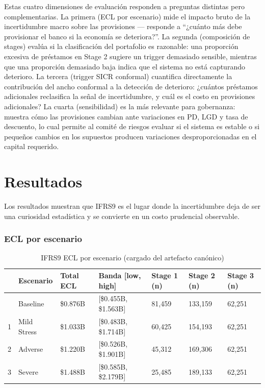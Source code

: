 \documentclass[
  spanish,
  11pt,
  letterpaper,
]{scrbook}
\theoremstyle{plain}
\theoremstyle{remark}
\begin{document}
Estas cuatro dimensiones de evaluación responden a preguntas distintas
pero complementarias. La primera (ECL por escenario) mide el impacto
bruto de la incertidumbre macro sobre las provisiones --- responde a
``¿cuánto más debe provisionar el banco si la economía se deteriora?''.
La segunda (composición de stages) evalúa si la clasificación del
portafolio es razonable: una proporción excesiva de préstamos en Stage 2
sugiere un trigger demasiado sensible, mientras que una proporción
demasiado baja indica que el sistema no está capturando deterioro. La
tercera (trigger SICR conformal) cuantifica directamente la contribución
del ancho conformal a la detección de deterioro: ¿cuántos préstamos
adicionales reclasifica la señal de incertidumbre, y cuál es el costo en
provisiones adicionales? La cuarta (sensibilidad) es la más relevante
para gobernanza: muestra cómo las provisiones cambian ante variaciones
en PD, LGD y tasa de descuento, lo cual permite al comité de riesgos
evaluar si el sistema es estable o si pequeños cambios en los supuestos
producen variaciones desproporcionadas en el capital requerido.

\chapter{Resultados}\label{sec-p2-results}

Los resultados muestran que IFRS9 es el lugar donde la incertidumbre
deja de ser una curiosidad estadística y se convierte en un costo
prudencial observable.

\subsection{ECL por escenario}\label{ecl-por-escenario}

{

\begin{longtable}[]{@{}lllllll@{}}

\caption{\label{tbl-p2-results}IFRS9 ECL por escenario (cargado del
artefacto canónico)}

\tabularnewline

\toprule\noalign{}
& Escenario & Total ECL & Banda {[}low, high{]} & Stage 1 (n) & Stage 2
(n) & Stage 3 (n) \\
\midrule\noalign{}
\endhead
\bottomrule\noalign{}
\endlastfoot
0 & Baseline & \$0.876B & {[}\$0.455B, \$1.563B{]} & 81,459 & 133,159 &
62,251 \\
1 & Mild Stress & \$1.033B & {[}\$0.483B, \$1.714B{]} & 60,425 & 154,193
& 62,251 \\
2 & Adverse & \$1.220B & {[}\$0.526B, \$1.901B{]} & 45,312 & 169,306 &
62,251 \\
3 & Severe & \$1.488B & {[}\$0.585B, \$2.179B{]} & 25,485 & 189,133 &
62,251 \\

\end{longtable}

}
\end{document}
